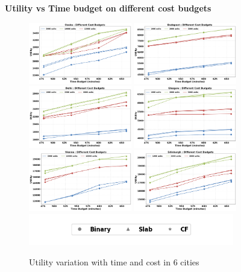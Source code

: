 \noindent\textbf{Utility vs Time budget on different cost budgets}\\

\begin{figure}[htbp]
    \centering
    \includegraphics[width=0.4\textwidth]{plots/exp1-osaka_pkj.png}
    \includegraphics[width=0.4\textwidth]{plots/exp1-budapest_pkj.png}
    \includegraphics[width=0.4\textwidth]{plots/exp1-delhi_pkj.png}
    \includegraphics[width=0.4\textwidth]{plots/exp1-glasgow_pkj.png}
    \includegraphics[width=0.4\textwidth]{plots/exp1-vienna_pkj.png}
    \includegraphics[width=0.4\textwidth]{plots/exp1-edinburgh_pkj.png}
    \includegraphics[width=0.8\textwidth]{plots/legend_pkj.png}
    \caption{Utility variation with time and cost in 6 cities}
    \label{fig:cities}
\end{figure}

